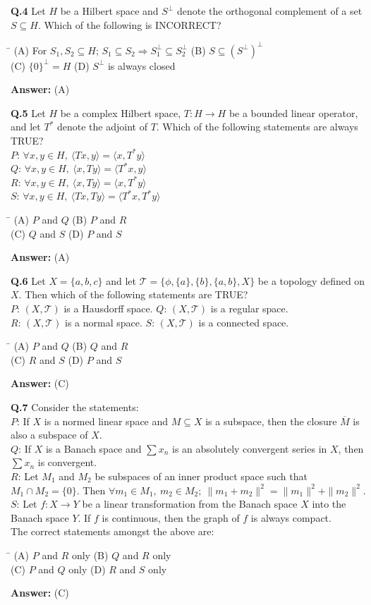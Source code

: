 \documentclass[11pt,a4paper]{article}
\newcommand{\optsfourA}[4]{%
  \begin{tabbing}
    \hspace{0.48\linewidth}\=\kill
    (A) #1 \> (B) #2 \\[2pt]
    (C) #3 \> (D) #4
  \end{tabbing}%
}
\newcommand{\ans}[1]{\textbf{Answer:} #1\par\medskip}
\begin{document}
\textbf{Q.4} Let $H$ be a Hilbert space and $S^\perp$ denote the orthogonal complement of a set $S \subseteq H$. Which of the following is INCORRECT?
\optsfourA{For $S_1, S_2 \subseteq H$; $S_1 \subseteq S_2 \Rightarrow S_1^\perp \subseteq S_2^\perp$}{$S \subseteq (S^\perp)^\perp$}{$\{0\}^\perp = H$}{$S^\perp$ is always closed}
\ans{(A)}

\textbf{Q.5} Let $H$ be a complex Hilbert space, $T : H \to H$ be a bounded linear operator, and let $T^*$ denote the adjoint of $T$. Which of the following statements are always TRUE?\\
$P$: $\forall x, y \in H,\ \langle Tx, y \rangle = \langle x, T^* y \rangle$\\
$Q$: $\forall x, y \in H,\ \langle x, Ty \rangle = \langle T^* x, y \rangle$\\
$R$: $\forall x, y \in H,\ \langle x, Ty \rangle = \langle x, T^* y \rangle$\\
$S$: $\forall x, y \in H,\ \langle Tx, Ty \rangle = \langle T^* x, T^* y \rangle$
\optsfourA{$P$ and $Q$}{$P$ and $R$}{$Q$ and $S$}{$P$ and $S$}
\ans{(A)}

\textbf{Q.6} Let $X = \{a, b, c\}$ and let $\mathcal{T} = \{\phi, \{a\}, \{b\}, \{a, b\}, X\}$ be a topology defined on $X$. Then which of the following statements are TRUE?\\
$P$: $(X, \mathcal{T})$ is a Hausdorff space. \qquad $Q$: $(X, \mathcal{T})$ is a regular space.\\
$R$: $(X, \mathcal{T})$ is a normal space. \qquad $S$: $(X, \mathcal{T})$ is a connected space.
\optsfourA{$P$ and $Q$}{$Q$ and $R$}{$R$ and $S$}{$P$ and $S$}
\ans{(C)}

\textbf{Q.7} Consider the statements:\\
$P$: If $X$ is a normed linear space and $M \subseteq X$ is a subspace, then the closure $\overline{M}$ is also a subspace of $X$.\\
$Q$: If $X$ is a Banach space and $\sum x_n$ is an absolutely convergent series in $X$, then $\sum x_n$ is convergent.\\
$R$: Let $M_1$ and $M_2$ be subspaces of an inner product space such that $M_1 \cap M_2 = \{0\}$. Then $\forall m_1 \in M_1,\ m_2 \in M_2;\ \|m_1 + m_2\|^2 = \|m_1\|^2 + \|m_2\|^2$.\\
$S$: Let $f : X \to Y$ be a linear transformation from the Banach space $X$ into the Banach space $Y$. If $f$ is continuous, then the graph of $f$ is always compact.\\
The correct statements amongst the above are:
\optsfourA{$P$ and $R$ only}{$Q$ and $R$ only}{$P$ and $Q$ only}{$R$ and $S$ only}
\ans{(C)}
\end{document}
